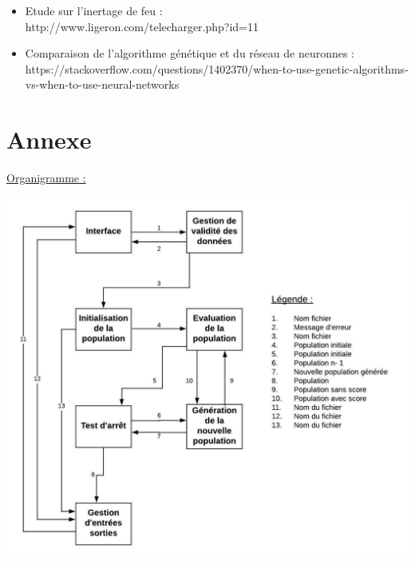 \documentclass[a4paper,11pt]{article}
\begin{document}
\begin{itemize}
		\item Etude sur l'inertage de feu :\\
		http://www.ligeron.com/telecharger.php?id=11\\

		\item Comparaison de l'algorithme génétique et du réseau de neuronnes :\\
		https://stackoverflow.com/questions/1402370/when-to-use-genetic-algorithms-vs-when-to-use-neural-networks\\
	\end{itemize}
	
	\newpage
	\section{Annexe}
		\underline{Organigramme :}\\
		\centerline{\includegraphics{OrganigrammeV5.jpeg}}
\end{document}
